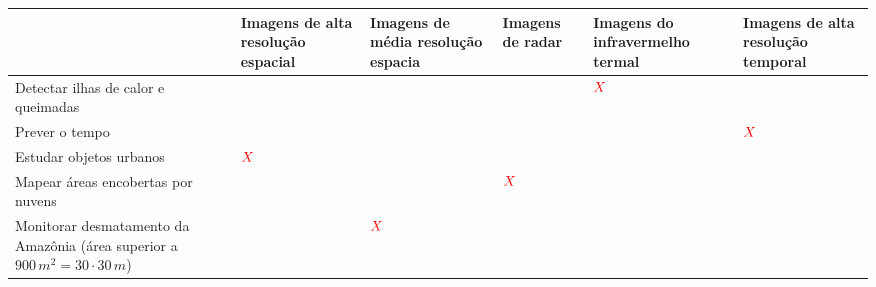\documentclass[a4paper, 12pt]{article}
\newcommand{\red}[1]{\textcolor{red}{#1}}
\begin{document}
\begin{flushleft}
\begin{itemize}
\begin{itemize}
\begin{center}
\begin{tabular}
{                    }
                        \hline
                        $\quad$ & Imagens de alta resolução espacial & Imagens de média resolução espacia & Imagens de radar & Imagens do infravermelho termal & Imagens de alta resolução temporal \\ \hline
                        Detectar ilhas de calor e queimadas & $\quad$ & $\quad$ & $\quad$ & $\red{X}$ & $\quad$ \\ \hline
                        Prever o tempo & $\quad$ & $\quad$ & $\quad$ & $\quad$ & $\red{X}$ \\ \hline
                        Estudar objetos urbanos & $\red{X}$ & $\quad$ & $\quad$ & $\quad$ & $\quad$ \\ \hline
                        Mapear áreas encobertas por nuvens & $\quad$ & $\quad$ & $\red{X}$ & $\quad$ & $\quad$ \\ \hline
                        Monitorar desmatamento da Amazônia (área superior a $900 \, m^2 = 30 \cdot  30 \, m$) & $\quad$ & $\red{X}$ & $\quad$ & $\quad$ & $\quad$ \\ \hline
                    \end{tabular} \end{center}
            \end{itemize}


\end{itemize}
\end{flushleft}
\end{document}
